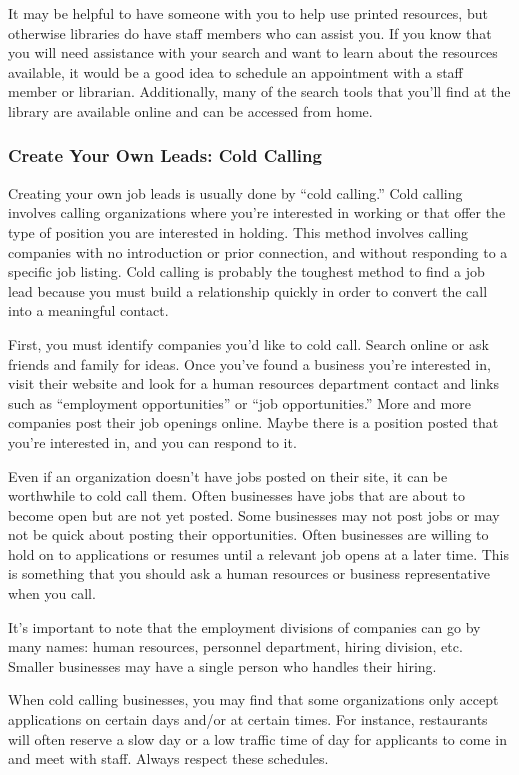 It may be helpful to have someone with you to help use printed resources, but otherwise libraries do have staff members who can assist you. If you know that you will need assistance with your search and want to learn about the resources available, it would be a good idea to schedule an appointment with a staff member or librarian. Additionally, many of the search tools that you'll find at the library are available online and can be accessed from home.

\subsubsection*{Create Your Own Leads: Cold Calling}

Creating your own job leads is usually done by ``cold calling.'' Cold calling involves calling organizations where you're interested in working or that offer the type of position you are interested in holding. This method involves calling companies with no introduction or prior connection, and without responding to a specific job listing. Cold calling is probably the toughest method to find a job lead because you must build a relationship quickly in order to convert the call into a meaningful contact.

First, you must identify companies you'd like to cold call. Search online or ask friends and family for ideas. Once you've found a business you're interested in, visit their website and look for a human resources department contact and links such as ``employment opportunities'' or ``job opportunities.'' More and more companies post their job openings online. Maybe there is a position posted that you're interested in, and you can respond to it.

Even if an organization doesn't have jobs posted on their site, it can be worthwhile to cold call them. Often businesses have jobs that are about to become open but are not yet posted. Some businesses may not post jobs or may not be quick about posting their opportunities. Often businesses are willing to hold on to applications or resumes until a relevant job opens at a later time. This is something that you should ask a human resources or business representative when you call.

It's important to note that the employment divisions of companies can go by many names: human resources, personnel department, hiring division, etc. Smaller businesses may have a single person who handles their hiring.

When cold calling businesses, you may find that some organizations only accept applications on certain days and/or at certain times. For instance, restaurants will often reserve a slow day or a low traffic time of day for applicants to come in and meet with staff. Always respect these schedules.

